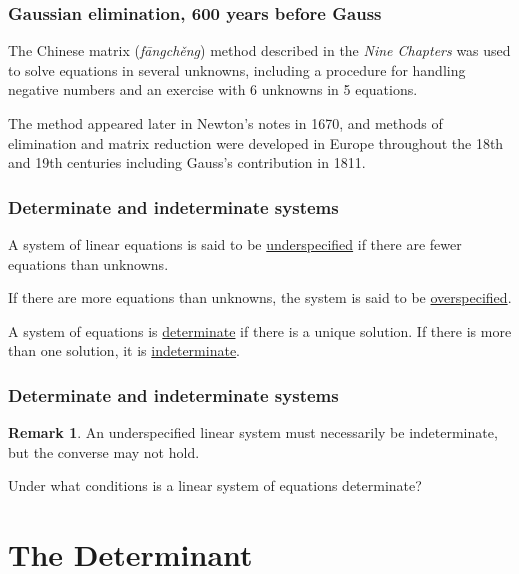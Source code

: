 \documentclass{beamer}
\theoremstyle{definition}
\newtheorem*{remark*}{Remark}
\begin{document}
\begin{frame}
    \frametitle{Gaussian elimination, 600 years before Gauss}

    The Chinese matrix (\textit{f\={a}ngch\v{e}ng}) method described in the \textit{Nine Chapters} was used to solve equations in several unknowns,
    including a procedure for handling negative numbers and an exercise with 6 unknowns in 5 equations.

    \pause
    The method appeared later in Newton's notes in 1670, and methods of elimination and matrix reduction were developed in Europe throughout the 18th and 19th centuries
    including Gauss's contribution in 1811\cite{roots}\cite{internet}.
\end{frame}

\begin{frame}
    \frametitle{Determinate and indeterminate systems}

    \begin{definition}
        A system of linear equations is said to be \underline{underspecified} if there are fewer equations than unknowns.

        If there are more equations than unknowns, the system is said to be \underline{overspecified}.
    \end{definition}
    \begin{definition}
        A system of equations is \underline{determinate} if there is a unique solution.
        If there is more than one solution, it is \underline{indeterminate}.
    \end{definition}
\end{frame}

\begin{frame}
    \frametitle{Determinate and indeterminate systems}

    \begin{remark*}
        An underspecified linear system must necessarily be indeterminate, but the converse may not hold.
    \end{remark*}
    \pause
    Under what conditions is a linear system of equations determinate?
\end{frame}

\section{The Determinant}
\end{document}
